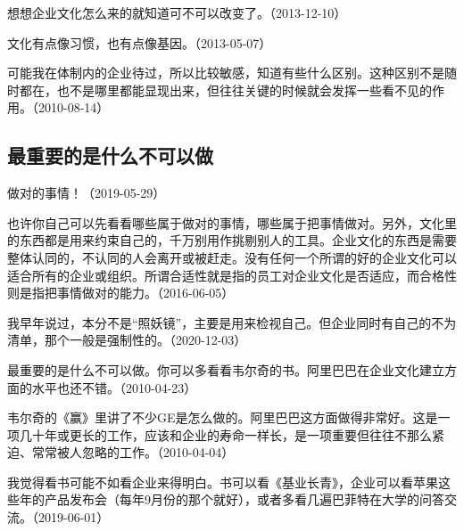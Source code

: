 想想企业文化怎么来的就知道可不可以改变了。（2013-12-10）


文化有点像习惯，也有点像基因。（2013-05-07）


可能我在体制内的企业待过，所以比较敏感，知道有些什么区别。这种区别不是随时都在，也不是哪里都能显现出来，但往往关键的时候就会发挥一些看不见的作用。（2010-08-14）

\subsection{最重要的是什么不可以做}


做对的事情！（2019-05-29）


也许你自己可以先看看哪些属于做对的事情，哪些属于把事情做对。另外，文化里的东西都是用来约束自己的，千万别用作挑剔别人的工具。企业文化的东西是需要整体认同的，不认同的人会离开或被赶走。没有任何一个所谓的好的企业文化可以适合所有的企业或组织。所谓合适性就是指的员工对企业文化是否适应，而合格性则是指把事情做对的能力。（2016-06-05）


我早年说过，本分不是“照妖镜”，主要是用来检视自己。但企业同时有自己的不为清单，那个一般是强制性的。（2020-12-03）


最重要的是什么不可以做。你可以多看看韦尔奇的书。阿里巴巴在企业文化建立方面的水平也还不错。（2010-04-23）

韦尔奇的《赢》里讲了不少GE是怎么做的。阿里巴巴这方面做得非常好。这是一项几十年或更长的工作，应该和企业的寿命一样长，是一项重要但往往不那么紧迫、常常被人忽略的工作。（2010-04-04）


我觉得看书可能不如看企业来得明白。书可以看《基业长青》，企业可以看苹果这些年的产品发布会（每年9月份的那个就好），或者多看几遍巴菲特在大学的问答交流。（2019-06-01）

